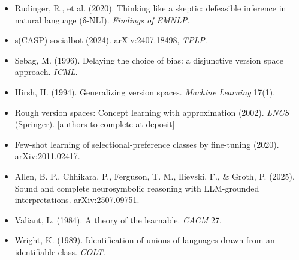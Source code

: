 \documentclass[11pt]{article}
\begin{document}
\begin{itemize}
\item Rudinger, R., et al. (2020). Thinking like a skeptic: defeasible inference in natural language (δ-NLI). \emph{Findings of EMNLP}.
\item s(CASP) socialbot (2024). arXiv:2407.18498, \emph{TPLP}.
\item Sebag, M. (1996). Delaying the choice of bias: a disjunctive version space approach. \emph{ICML}.
\item Hirsh, H. (1994). Generalizing version spaces. \emph{Machine Learning} 17(1).
\item Rough version spaces: Concept learning with approximation (2002). \emph{LNCS} (Springer). [authors to complete at deposit]
\item Few-shot learning of selectional-preference classes by fine-tuning (2020). arXiv:2011.02417.
\item Allen, B. P., Chhikara, P., Ferguson, T. M., Ilievski, F., \& Groth, P. (2025). Sound and complete neurosymbolic reasoning with LLM-grounded interpretations. arXiv:2507.09751.
\item Valiant, L. (1984). A theory of the learnable. \emph{CACM} 27.
\item Wright, K. (1989). Identification of unions of languages drawn from an identifiable class. \emph{COLT}.

\end{itemize}
\end{document}
